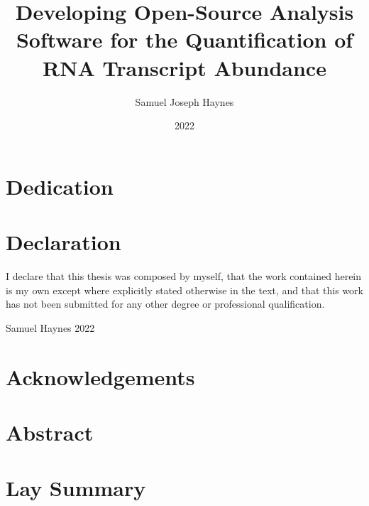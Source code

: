 \documentclass{SBCbookchapter}
\begin{document}
\title{Developing Open-Source Analysis Software for the Quantification of RNA Transcript Abundance}
\author{Samuel Joseph Haynes}
\date{2022}
\makethesistitle

\newpage

\renewcommand{\thepage}{\roman{page}}

\chapter{Dedication}


\newpage

\chapter{Declaration}
I declare that this thesis was composed by myself, that the work contained herein
is my own except where explicitly stated otherwise in the text, and that this work has
not been submitted for any other degree or professional qualification.

Samuel Haynes 
2022

\newpage

\chapter{Acknowledgements}

\newpage

\chapter{Abstract}

%

\newpage

\chapter{Lay Summary}

\newpage

\tableofcontents

\newpage

\listoffigures

\newpage

\listoftables

\newpage

\pagestyle{fancy}
\fancyhf{}
\fancyhead[RO]{\nouppercase{\rightmark\hfill\thepage}}
\fancyhead[LE]{\nouppercase{\thepage\hfill}}
\end{document}
